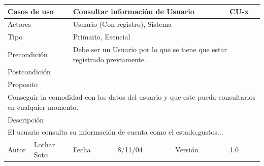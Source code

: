 \documentclass{article}
\begin{document}
\begin{table}[h]
\begin{tabular}{|l|l|l|l|l|l|}
\hline
\multicolumn{2}{|p{2cm}|}{Casos de uso}  & \multicolumn{3}{p{7cm}|}{Consultar información de Usuario} & CU-x \\
\hline
\multicolumn{2}{|p{2cm}|}{Actores}       & \multicolumn{4}{p{8cm}|}{Usuario (Con registro), Sistema}        \\
\hline
\multicolumn{2}{|p{2cm}|}{Tipo}          & \multicolumn{4}{p{8cm}|}{Primario, Esencial}        \\
\hline
\multicolumn{2}{|p{2cm}|}{Precondición}  & \multicolumn{4}{p{8cm}|}{Debe ser un Usuario por lo que se tiene que estar registrado previamente.}        \\
\hline
\multicolumn{2}{|p{2cm}|}{Postcondición} & \multicolumn{4}{p{8cm}|}{}        \\
\hline
\multicolumn{6}{|p{10cm}|}{Proposito}                                   \\
\hline
\multicolumn{6}{|p{10cm}|}{Conseguir la comodidad con los datos del usuario y que este pueda consultarlos en cualquier momento.}                                            \\
\hline
\multicolumn{6}{|p{10cm}|}{Descripción}                                 \\
\hline
\multicolumn{6}{|p{10cm}|}{El usuario consulta su información de cuenta como el estado,gustos...}                                            \\
\hline
Autor              &     Lothar Soto         & Fecha    &  8/11/04   &   Versión  & 1.0\\     
\hline
\end{tabular}
\end{table}
\end{document}
